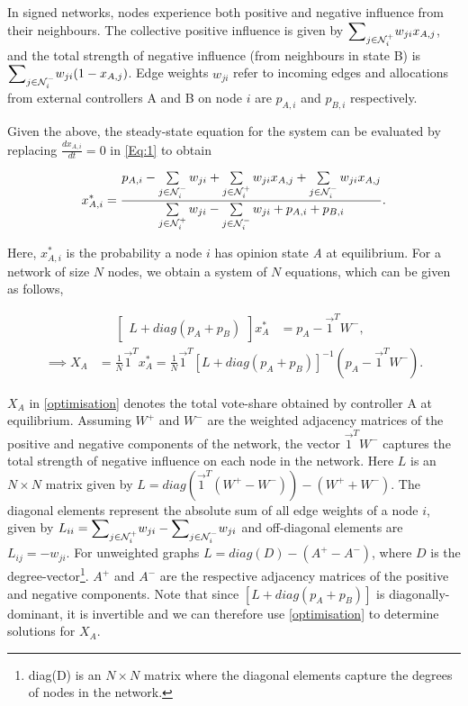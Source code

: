 In signed networks, nodes experience both positive and negative influence from their neighbours. The collective positive influence is given by ${\displaystyle\sum}_{j \in {\cal N}_{i}^+} w_{ji}x_{A,j}$, and the total strength of negative influence (from neighbours in state B) is ${\displaystyle\sum}_{j \in {\cal N}_{i}^-} w_{ji}(1-x_{A,j})$.    
Edge weights $w_{ji}$ refer to incoming edges and allocations from external controllers A and B on node $i$ are $p_{A,i}$ and $p_{B,i}$ respectively. 

Given the above, the steady-state equation for the system can be evaluated by replacing $\frac{dx_{A,i}}{dt}=0$ in \cref{Eq:1} to obtain

\begin{equation}
   x_{A,i}^* = \frac{p_{A,i} - \sum\limits_{j \in {\cal N}_i^-}w_{ji} + \sum\limits_{j \in {\cal N}_{i}^+}w_{ji} x_{A,j} + \sum\limits_{j\in {\cal N}_{i}^-}w_{ji} x_{A,j}}{\sum\limits_{j\in {\cal N}_{i}^+}w_{ji} - \sum\limits_{j\in {\cal N}_{i}^-}w_{ji} + p_{A,i} + p_{B,i}}. 
    \label{steady-state}
\end{equation}

Here, $x_{A,i}^*$ is the probability a node $i$ has opinion state \emph{A} at equilibrium. 
For a network of size $N$ nodes, we obtain a system of $N$ equations, which can be given as follows, 

\begin{align*}
\quad
\begin{bmatrix}
L+diag(p_{A}+p_{B})
\end{bmatrix}
x_{A}^* &=
p_{A}-\vec{1}^T W^-,
\end{align*}
\begin{align}
\implies    X_{A} &= \frac{1}{N}\Vec{1}^{T} {x_{A}^*} = \frac{1}{N} \Vec{1}^{T}  [L+diag(p_{A}+p_{B})] ^{-1}(p_{A}-\vec{1}^T W^-).
    \label{optimisation}
\end{align}

$X_{A}$ in \cref{optimisation} denotes the total vote-share obtained by controller A at equilibrium. Assuming $W^+$ and $W^-$ are the weighted adjacency matrices of the positive and negative components of the network, the vector $\vec{1}^T W^-$ captures the total strength of negative influence on each node in the network. Here $L$ is an $N \times N$ matrix given by $L = diag(\vec{1}^T(W^+ - W^-)) - (W^+ + W^-)$. The diagonal elements represent the absolute sum of all edge weights of a node $i$, given by $L_{ii} = {\displaystyle\sum}_{j \in {\cal N}_{i}^+} w_{ji} - {\displaystyle\sum}_{j \in {\cal N}_{i}^-} w_{ji}$ and off-diagonal elements are $L_{ij} = -w_{ji}$. For unweighted graphs $L = diag(D) - (A^+ - A^-)$, where $D$ is the degree-vector\footnote{diag(D) is an $N \times N$ matrix where the diagonal elements capture the degrees of nodes in the network.}. $A^+$ and $A^-$ are the respective adjacency matrices of the positive and negative components. Note that since $[L + diag(p_{A} +p_{B})]$ is diagonally-dominant, it is invertible and we can therefore use \cref{optimisation} to determine solutions for $X_{A}$. 

